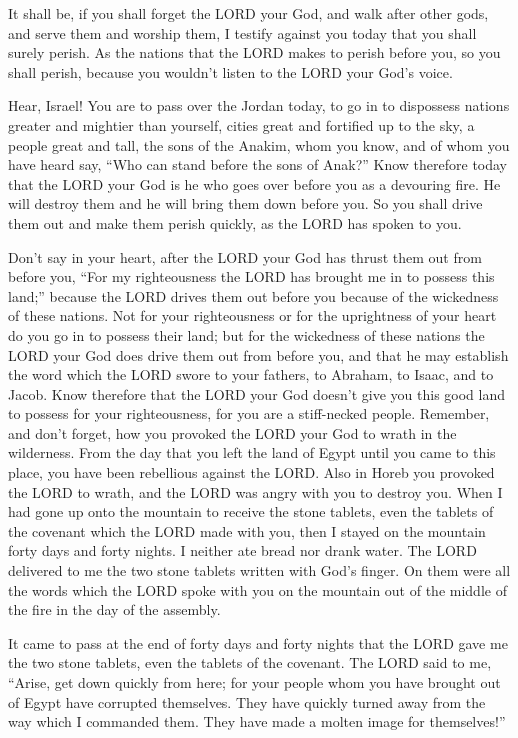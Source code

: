 \myverse{}It shall be, if you shall forget the LORD your God, and walk
after other gods, and serve them and worship them, I testify against you today that you shall surely perish.
\myverse{}As the nations that the LORD makes to perish before you, so you shall perish,
because you wouldn’t listen to the LORD your God’s voice.


 \myverse*{}Hear, Israel! You are to pass over the Jordan today, to go in to
dispossess nations greater and mightier than yourself, cities great and fortified up to the sky,
\myverse{}a people great and tall, the sons of the Anakim, whom you know, and of whom
you have heard say, “Who can stand before the sons of Anak?”
\myverse{}Know therefore today that the LORD your God is he who goes over before you as
a devouring fire. He will destroy them and he will bring them down before you. So you shall drive them
out and make them perish quickly, as the LORD has spoken to you.


\myverse{}Don’t say in your heart, after the LORD your God has thrust them
out from before you, “For my righteousness the LORD has brought me in to possess this land;” because the
LORD drives them out before you because of the wickedness of these nations.
\myverse{}Not for your righteousness or for the uprightness of your heart do you go in
to possess their land; but for the wickedness of these nations the LORD your God does drive them out from
before you, and that he may establish the word which the LORD swore to your fathers, to Abraham, to Isaac,
and to Jacob.
\myverse{}Know therefore that the LORD your God doesn’t give you this good land to possess
for your righteousness, for you are a stiff-necked people.
\myverse{}Remember, and don’t forget, how you provoked the LORD your God to wrath in the
wilderness. From the day that you left the land of Egypt until you came to this place, you have been rebellious
against the LORD.
\myverse{}Also in Horeb you provoked the LORD to wrath, and the LORD was angry with you
to destroy you.
\myverse{}When I had gone up onto the mountain to receive the stone tablets, even the
tablets of the covenant which the LORD made with you, then I stayed on the mountain forty days and forty
nights. I neither ate bread nor drank water.
\myverse{}The LORD delivered to me the two stone tablets written with God’s finger.
On them were all the words which the LORD spoke with you on the mountain out of the middle of the fire
in the day of the assembly.


\myverse{}It came to pass at the end of forty days and forty nights that
the LORD gave me the two stone tablets, even the tablets of the covenant.
\myverse{}The LORD said to me, “Arise, get down quickly from here; for your people whom
you have brought out of Egypt have corrupted themselves. They have quickly turned away from the way which
I commanded them. They have made a molten image for themselves!”


